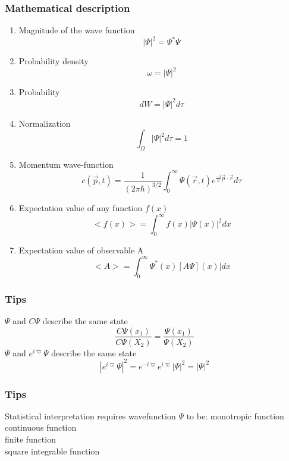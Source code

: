 \begin{frame}[allowframebreaks=]
    \frametitle{Mathematical description}
    \begin{enumerate}
        \item Magnitude of the wave function \[|\Psi|^2 =\Psi^* \Psi \]
        \item Probability density \[\omega = |\Psi|^2 \]
        \item Probability  \[ d W = |\Psi|^2 d \tau \]
        \item Normalization \[ \int_{\Omega} |\Psi|^2 d \tau =1 \]
        \item Momentum wave-function \[ c(\vec{p},t)=\frac{1}{(2\pi\hbar)^{3/2}} \int_{0}^{\infty} \Psi(\vec{r},t) e^{\frac{-i}{\hbar} \vec{p}\cdot \vec{r} } d \tau \] 
        \item Expectation value of any function $f (x)$  \[ <f(x)>=\int_{0}^{\infty} f(x) |\Psi(x)|^2 dx \]
        \item Expectation value of observable A \[ <A>=\int_{0}^{\infty} \Psi^*(x) [A \Psi](x)| dx \]
    \end{enumerate}
\end{frame}

\begin{frame}
    \frametitle{Tips}
    \bullet $\Psi$ and $C\Psi$ describe the same state 
    \[ \frac{C\Psi(x_1)}{C\Psi(X_2)} = \frac{\Psi(x_1)}{\Psi(X_2)}\]
    \bullet $\Psi$ and $e^{i\varpi}\Psi$ describe the same state 
    \[ |e^{i\varpi}\Psi|^2 = e^{-i\varpi} e^{i\varpi} |\Psi|^2 = |\Psi|^2 \]   
\end{frame}

\begin{frame}
    \frametitle{Tips}
    Statistical interpretation requires wavefunction $\Psi$ to be:
    \bullet monotropic function\\
    \bullet continuous function \\
    \bullet finite function\\
    \bullet square integrable function
\end{frame}

